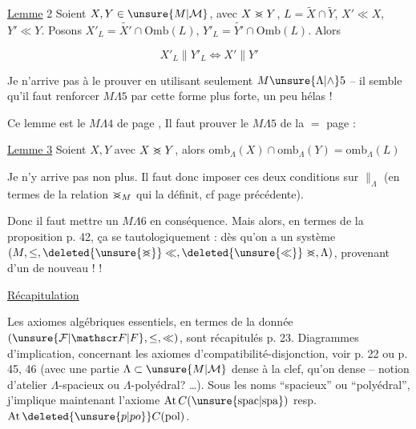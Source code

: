 
\uline{Lemme} 2 Soient $X,Y\in\unsure{M|\mathcal M}$, avec $X\mathrel{>\mkern-13mu<}Y$, $L=\widetilde X\cap\widetilde Y$, $X'\ll X$, $Y'\ll Y$. Posons $X'_L=\widetilde{X'}\cap\mathrm{Omb}(L)$, $Y'_L=\widetilde{Y'}\cap\mathrm{Omb}(L)$. Alors

\[
X'_L\parallel Y'_L\Longleftrightarrow X'\parallel Y'
\]

 Je n'arrive pas à le prouver en utilisant seulement $M\unsure{\Lambda|\wedge}5$ -- il semble qu'il faut renforcer $M\Lambda5$ par cette forme plus forte, un peu  hélas !

Ce lemme est le $M\Lambda4$ de page , Il faut prouver le $M\Lambda5$ de la $=$ page :

\uline{Lemme 3} Soient $X,Y$ avec $X\mathrel{>\mkern-13mu<}Y$,    alors $\mathrm{omb}_{\Lambda}(X)\cap\mathrm{omb}_{\Lambda}(Y)=\mathrm{omb}_{\Lambda}(L)$

Je n'y arrive pas non plus. Il faut donc imposer ces deux conditions sur $\parallel_{\Lambda}$ (en termes de la relation $\mathrel{>\mkern-13mu<}_{M}$ qui la définit, cf page précédente).

Donc il faut mettre un $M\Lambda6$ en conséquence. Mais alors, en termes de la proposition p. 42, ça se  tautologiquement : dès qu'on a un système $(M,\leq,\deleted{\unsure{\mathrel{>\mkern-13mu<}}}\ll,\deleted{\unsure{\ll}}\mathrel{>\mkern-13mu<},\Lambda)$,  provenant d'un     de nouveau !  !


\uline{Récapitulation}

Les axiomes algébriques essentiels, en termes de la donnée $(\unsure{\mathcal F|\mathscr F|F},\leq,\ll)$, sont récapitulés p. 23. Diagrammes d'implication, concernant les axiomes d'compatibilité-disjonction, voir p. 22 ou p. 45, 46 (avec une \deleted{$\unsure{\Lambda|\wedge}$} partie $\Lambda\subset\unsure{M|\mathcal M}$ dense à la clef, qu'on   dense -- notion d'atelier $\Lambda$-spacieux ou $\Lambda$-polyédral? \ldots). Sous les noms ``spacieux'' ou ``polyédral'', j'implique maintenant l'axiome $\mathrm{At}\,C(\unsure{\mathrm{spac}|\mathrm{spa}})$ resp. $\mathrm{At}\,\deleted{\unsure{p|po}}C(\mathrm{pol})$.

